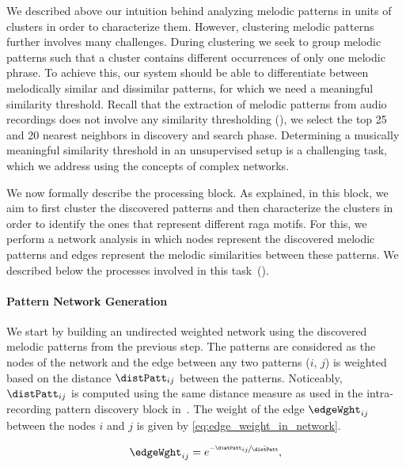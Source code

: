 {We described above our intuition behind analyzing melodic patterns in units of clusters in order to characterize them. However, clustering melodic patterns further involves many challenges. During clustering we seek to group melodic patterns such that a cluster contains different occurrences of only one melodic phrase. To achieve this, our system should be able to differentiate between melodically similar and dissimilar patterns, for which we need a meaningful similarity threshold. Recall that the extraction of melodic patterns from audio recordings does not involve any similarity thresholding (), we select the top 25 and 20 nearest neighbors in discovery and search phase. Determining a musically meaningful similarity threshold in an unsupervised setup is a challenging task, which we address using the concepts of complex networks. 
 
We now formally describe the processing block. As explained, in this block, we aim to first cluster the discovered patterns and then characterize the clusters in order to identify the ones that represent different \gls{raga} motifs. For this, we perform a network analysis in which nodes represent the discovered melodic patterns and edges represent the melodic similarities between these patterns. We described below the processes involved in this task~(). 


\paragraph{Pattern Network Generation}
\label{sec:network_generation}

We start by building an undirected weighted network using the discovered melodic patterns from the previous step. The patterns are considered as the nodes of the network and the edge between any two patterns ($i$, $j$) is weighted based on the distance $\distPatt_{ij}$ between the patterns. Noticeably, $\distPatt_{ij}$ is computed using the same distance measure as used in the intra-recording pattern discovery block in~. The weight of the edge $\edgeWght_{ij}$ between the nodes $i$ and $j$ is given by \eqref{eq:edge_weight_in_network}. 

\begin{equation}
\edgeWght_{ij} = e^{\nicefrac{-\distPatt_{ij}}{\bar{\distPatt}}},
\label{eq:edge_weight_in_network}
\end{equation}

}
